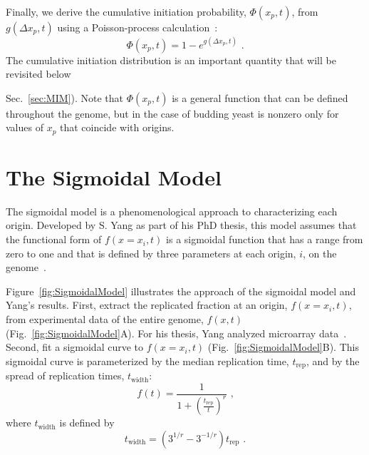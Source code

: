 		Finally, we derive the cumulative initiation probability, $\Phi(x_p,t)$, from $g(\Delta x_p,t)$ using a Poisson-process calculation~\cite{Spikes}:
		\begin{equation} \label{eq:PhiFromG}
			\Phi\left( x_p,t\right) = 1 - e^{g\left(\Delta x_p,t\right)} \text{ .}
		\end{equation}
		The cumulative initiation distribution is an important quantity that will be revisited below {Sec.~\ref{sec:MIM}).
		Note that $\Phi(x_p,t)$ is a general function that can be defined throughout the genome, but in the case of budding yeast is nonzero only for values of $x_p$ that coincide with origins.


	\section{The Sigmoidal Model}
	\label{sec:SigmoidalModel}
	
	The sigmoidal model is a phenomenological approach to characterizing each origin.
	Developed by S. Yang as part of his PhD thesis, this model assumes that the functional form of $f(x=x_i,t)$ is a sigmoidal function that has a range from zero to one and that is defined by three parameters at each origin, $i$, on the genome~\cite{ScottsPaper,ScottsThesis}.
	
	Figure~\ref{fig:SigmoidalModel} illustrates the approach of the sigmoidal model and Yang's results.
	First, extract the replicated fraction at an origin, $f(x=x_i,t)$, from experimental data of the entire genome, $f(x,t)$ (Fig.~\ref{fig:SigmoidalModel}A).
	For his thesis, Yang analyzed microarray data~\cite{McCuneMicroArray}.
	Second, fit a sigmoidal curve to $f(x=x_i,t)$ (Fig.~\ref{fig:SigmoidalModel}B).
	This sigmoidal curve is parameterized by the median replication time, $t_{\text{rep}}$, and by the spread of replication times, $t_{\text{width}}$:
	\begin{equation} \label{eq:SigmoidalModel}
		f(t) = {\frac{1}{1+\left({\frac{t_{\text{rep}}}{t}}\right)^r}}\text{ ,}
	\end{equation}
	where $t_{\text{width}}$ is defined by
	\begin{equation}
		t_{\text{width}} = \left(3^{1/r}-3^{-1/r}\right)t_{\text{rep}}\text{ .}
	\end{equation}
	
}
